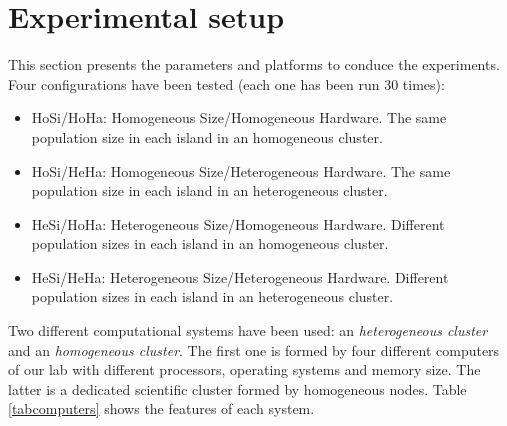 \section{Experimental setup}
\label{sec:experiments}
This section presents the parameters and platforms to conduce the experiments. Four configurations have been tested (each one has been run 30 times):

\begin{itemize}
\item HoSi/HoHa: Homogeneous Size/Homogeneous Hardware. The same population size in each island in an homogeneous cluster.
\item HoSi/HeHa: Homogeneous Size/Heterogeneous Hardware. The same population size in each island in an heterogeneous cluster.
\item HeSi/HoHa: Heterogeneous Size/Homogeneous Hardware. Different population sizes in each island in an homogeneous cluster.
\item HeSi/HeHa: Heterogeneous Size/Heterogeneous Hardware. Different population sizes in each island in an heterogeneous cluster.
\end{itemize}

Two different computational systems have been used: an {\em heterogeneous cluster} and an {\em homogeneous cluster}. The first one is formed by four different computers of our lab with different processors, operating systems and memory size. The latter is a dedicated scientific cluster formed by homogeneous nodes. Table \ref{tabcomputers} shows the features of each system.

\begin{table*}
\end{table*}


